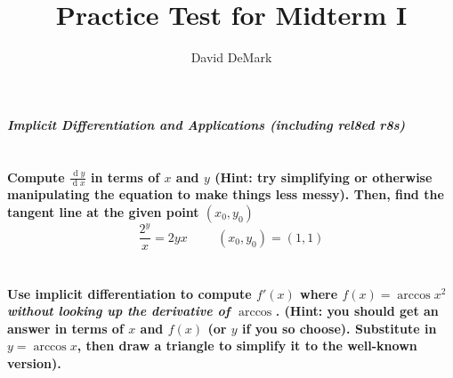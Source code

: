 \documentclass[english]{article}
\title{Practice Test for Midterm I}
\author{David DeMark}
\date{\due}
\renewcommand{\d}[1]{\ensuremath{\operatorname{d}\!{#1}}}
\newcommand{\dydx}[2]{\frac{\d #1}{\d #2}}
\DeclarePairedDelimiter\abs{\lvert}{\rvert}%
\newcommand{\prob}[1]{\setcounter{section}{#1-1}\section{}}
\newcommand{\prt}[1]{\setcounter{subsection}{#1-1}\subsection{}}
\theoremstyle{remark}
\theoremstyle{definition}
\newcommand{\ild}[1]{\displaystyle{#1}}
\begin{document}
%
%
%
%
	\begin{center}{\Large\textbf{\emph{Implicit Differentiation and Applications (including rel8ed r8s)}}}\end{center}
	\prob{1} \textbf{Compute $\dydx{y}{x}$ in terms of $x$ and $y$ (Hint: try simplifying or otherwise manipulating the equation to make things less messy). Then, find the tangent line at the given point $(x_0,y_0)$}\newline
	$$\ild{\frac{2^{y}}{x}=2yx}\hspace{1cm}(x_0,y_0)=(1,1)$$
\vspace{4.5cm}
\prob{2} \textbf{Use implicit differentiation to compute $f'(x)$ where $f(x)=\arccos{x^2}$ \emph{without looking up the derivative of $\arccos$.} (Hint: you should get an answer in terms of $x$ and $f(x)$ (or $y$ if you so choose). Substitute in $y=\arccos x$, then draw a triangle to simplify it to the well-known version).}\vspace{4cm}
\end{document}
